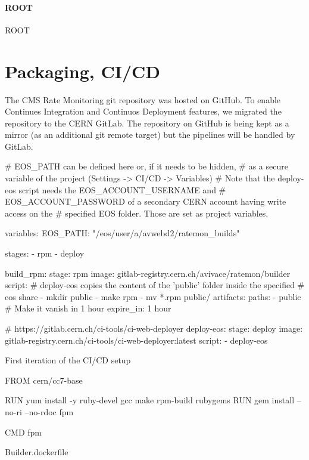 \paragraph{ROOT} ROOT \cite{Brun:1997pa} 


\section{Packaging, CI/CD}

The CMS Rate Monitoring git repository was hosted on GitHub. To enable Continues Integration and Continuos Deployment features, we migrated the repository to the CERN GitLab. The repository on GitHub is being kept as a mirror (as an additional git remote target) but the pipelines will be handled by GitLab.


\begin{listing}[ht]
\begin{yamlcode}

# EOS_PATH can be defined here or, if it needs to be hidden, 
# as a secure variable of the project (Settings -> CI/CD -> Variables)
# Note that the deploy-eos script needs the EOS_ACCOUNT_USERNAME and 
# EOS_ACCOUNT_PASSWORD of a secondary CERN account having write access on the
# specified EOS folder. Those are set as project variables.

variables:
  EOS_PATH: "/eos/user/a/avwebd2/ratemon_builds"

stages:
  - rpm
  - deploy

build_rpm:
  stage: rpm
  image: gitlab-registry.cern.ch/avivace/ratemon/builder
  script:
    # deploy-eos copies the content of the 'public' folder inside the specified
    # eos share
    - mkdir public
    - make rpm
    - mv *.rpm public/
  artifacts:
    paths:
      - public
    # Make it vanish in 1 hour
    expire_in: 1 hour

# https://gitlab.cern.ch/ci-tools/ci-web-deployer
deploy-eos:
  stage: deploy
  image: gitlab-registry.cern.ch/ci-tools/ci-web-deployer:latest
  script:
    - deploy-eos

\end{yamlcode}
\caption{First iteration of the CI/CD setup}
\end{listing}

\begin{listing}[ht]
\begin{yamlcode}
FROM cern/cc7-base

RUN yum install -y ruby-devel gcc make rpm-build rubygems
RUN gem install --no-ri --no-rdoc fpm

CMD fpm
\end{yamlcode}
\caption{Builder.dockerfile}
\end{listing}

